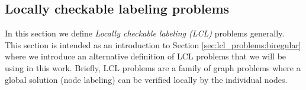 
\subsection{Locally checkable labeling problems} \label{sec:lcl_problems}
In this section we define \emph{Locally checkable labeling (LCL)} problems generally.
This section is intended as an introduction to Section \ref{sec:lcl_problems:biregular} where we introduce an alternative definition of LCL problems that we will be using in this work.
Briefly, LCL problems are a family of graph problems where a global solution (node labeling) can be verified locally by the individual nodes.



\newcommand{\Sigmain}{\Sigma_{\text{in}}}
\newcommand{\Sigmaout}{\Sigma_{\text{out}}}



